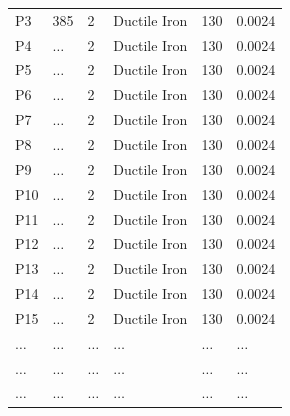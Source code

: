 \documentclass[12pt]{article}
\begin{document}
\begin{enumerate}
\begin{table}[h!]
\begin{tabular}{p{1in}p{1in}p{1in}p{1in}p{1in}p{1in}}
P3 & 385 & 2 &Ductile Iron & 130 & 0.0024  \\
P4 & $\dots$ & 2 &Ductile Iron & 130 & 0.0024  \\
P5 & $\dots$ & 2 &Ductile Iron & 130 & 0.0024  \\
P6 & $\dots$ & 2 &Ductile Iron & 130 & 0.0024  \\
P7 & $\dots$ & 2 &Ductile Iron & 130 & 0.0024  \\
P8 & $\dots$ & 2 &Ductile Iron & 130 & 0.0024  \\
P9 & $\dots$ & 2 &Ductile Iron & 130 & 0.0024  \\
P10 & $\dots$ & 2 &Ductile Iron & 130 & 0.0024  \\
P11 & $\dots$ & 2 &Ductile Iron & 130 & 0.0024  \\
P12 & $\dots$ & 2 &Ductile Iron & 130 & 0.0024  \\
P13 & $\dots$ & 2 &Ductile Iron & 130 & 0.0024  \\
P14 & $\dots$ & 2 &Ductile Iron & 130 & 0.0024 \\
P15 & $\dots$ & 2 &Ductile Iron & 130 & 0.0024  \\
$\dots$ & $\dots$ & $\dots$& $\dots$&$\dots$& $\dots$ \\
$\dots$ & $\dots$ & $\dots$& $\dots$&$\dots$& $\dots$ \\
$\dots$ & $\dots$ & $\dots$& $\dots$&$\dots$& $\dots$ \\

\end{tabular}
\end{table}
\end{enumerate}
\end{document}
